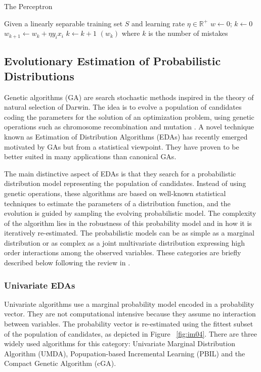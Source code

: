 \begin{algorithm}[ht]
	\caption{\textsf{The Perceptron}} 
	\begin{algorithmic}
		\REQUIRE Given a linearly separable training set $S$ and learning rate $\eta \in \mathbb{R}^+$ 
		\STATE $w \gets 0$; $k \gets 0$
		\REPEAT 
						\STATE $w_{k+1} \gets w_k + \eta y_i x_i$
						\STATE $k \gets k + 1$
					\ENDIF
				\ENDFOR				
		\ENSURE $(w_k)$ where $k$ is the number of mistakes
	\end{algorithmic}
  \label{alg:percep}
\end{algorithm}

\subsection{Evolutionary Estimation  of Probabilistic Distributions}
Genetic algorithms (GA) are search stochastic methods inspired in the theory of natural selection of Darwin.  The idea is to evolve a population of candidates coding the parameters for the solution of an optimization problem, using genetic operations such as chromosome recombination and mutation \cite{goldberg89}. A novel technique known as Estimation of Distribution Algorithms (EDAs) has recently emerged motivated by GAs but from a statistical viewpoint. They have proven to be better suited in many applications than canonical GAs\cite{larranaga01}.  

The main distinctive aspect of EDAs is that they search for a probabilistic distribution model representing the population of candidates. Instead of using genetic operations, these algorithms are based on well-known statistical techniques to estimate the parameters of a distribution function, and the evolution is guided by sampling the evolving probabilistic model. The complexity of the algorithm lies in the robustness of this probability model and in how it is iteratively re-estimated.  The probabilistic models can be as simple as a marginal distribution or as complex as a joint multivariate distribution expressing high order interactions among the observed variables. These categories are briefly described below following the review in \cite{larranaga08}.

\subsubsection{Univariate EDAs}
Univariate algorithms use a marginal probability model encoded in a probability vector.  They are not computational intensive because they assume no interaction between variables. The probability vector is re-estimated using the fittest subset of the population of candidates, as depicted in Figure ~\ref{fig:im04}. There are three widely used algorithms for this category: Univariate Marginal Distribution Algorithm (UMDA\cite{muhlen96}), Popupation-based Incremental Learning (PBIL\cite{baluja94}) and the Compact Genetic Algorithm (cGA\cite{baluja95, harik98}).  

